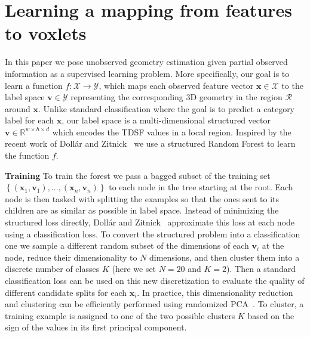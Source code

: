 \documentclass[10pt,twocolumn,letterpaper]{article}
\renewcommand{\paragraph}{\vspace{2pt}\noindent\textbf}
\begin{document}
\section{Learning a mapping from features to voxlets}
\label{sec:forest_train}
In this paper we pose unobserved geometry estimation given partial observed information as a supervised learning problem. 
More specifically, our goal is to learn a function $f: \mathcal{X}\to \mathcal{Y}$, which maps each observed feature vector $\mathbf{x} \in \mathcal{X}$ to the label space $\mathbf{v} \in \mathcal{Y}$ representing the corresponding 3D geometry in the region $\mathcal{R}$ around $\mathbf{x}$. 
Unlike standard classification where the goal is to predict a category label for each $\mathbf{x}$, our label space is a multi-dimensional structured vector $\mathbf{v} \in \mathbb{R}^{w\times{}h\times{}d}$ which encodes the TDSF values in a local region. 
Inspired by the recent work of Doll{\'a}r and Zitnick~\cite{dollar-iccv-2013} we use a structured Random Forest to learn the function $f$. 

\paragraph{Training} 
To train the forest we pass a bagged subset of the training set $\left\{(\mathbf{x}_1, \mathbf{v}_1), ..., (\mathbf{x}_n, \mathbf{v}_n)\right\}$ to each node in the tree starting at the root. 
Each node is then tasked with splitting the examples so that the ones sent to its children are as similar as possible in label space. 
Instead of minimizing the structured loss directly, Doll{\'a}r and Zitnick~\cite{dollar-iccv-2013} approximate this loss at each node using a classification loss.
To convert the structured problem into a classification one we sample a different random subset of the dimensions of each $\mathbf{v}_i$ at the node, reduce their dimensionality to $N$ dimensions, and then cluster them into a discrete number of classes $K$ (here we set $N=20$ and $K=2$).
Then a standard classification loss can be used on this new discretization to evaluate the quality of different candidate splits for each $\mathbf{x}_i$. 
In practice, this dimensionality reduction and clustering can be efficiently performed using randomized PCA~\cite{halko-siam-2011}.
To cluster, a training example is assigned to one of the two possible clusters $K$ based on the sign of the values in its first principal component. 
\end{document}
